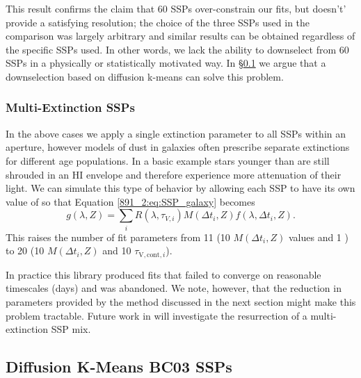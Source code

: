 This result confirms the claim that 60 SSPs over-constrain our fits,
but doesn't' provide a satisfying resolution; the choice of the three
SSPs used in the comparison was largely arbitrary and similar results
can be obtained regardless of the specific SSPs used. In other words,
we lack the ability to downselect from 60 SSPs in a physically or
statistically motivated way. In \S\ref{891_2:sec:bc03_dfk} we argue
that a downselection based on diffusion k-means can solve this
problem.



\subsubsection{Multi-Extinction SSPs}

In the above cases we apply a single extinction parameter to all SSPs
within an aperture, however models of dust in galaxies often prescribe
separate extinctions for different age populations. In a basic example
\citep{Charlot00} stars younger than  are still shrouded
in an HI envelope and therefore experience more attenuation of their
light. We can simulate this type of behavior by allowing each SSP to
have its own value of \tauV so that Equation \ref{891_2:eq:SSP_galaxy}
becomes
\begin{equation}
g(\lambda,Z) = \sum_{i} R(\lambda,\tau_{V,i}) M(\Delta t_i,Z)
f(\lambda,\Delta t_i, Z).
\end{equation}
This raises the number of fit parameters from 11 (10 $M(\Delta t_i, Z)$
values and 1 \tauV) to 20 (10 $M(\Delta t_i, Z)$ and 10
$\tau_{\mathrm{V,cont},i}$).

In practice this library produced fits that failed to converge on
reasonable timescales (days) and was abandoned. We note, however, that
the reduction in parameters provided by the method discussed in the
next section might make this problem tractable. Future work in will
investigate the resurrection of a multi-extinction SSP mix.

\subsection{Diffusion K-Means BC03 SSPs}
\label{891_2:sec:bc03_dfk}

